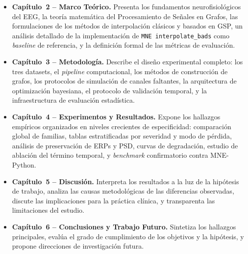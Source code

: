 \begin{itemize}
    \item \textbf{Capítulo~2 -- Marco Teórico.} Presenta los fundamentos neurofisiológicos del EEG, la teoría matemática del Procesamiento de Señales en Grafos, las formulaciones de los métodos de interpolación clásicos y basados en GSP, un análisis detallado de la implementación de \texttt{MNE interpolate\_bads} como \textit{baseline} de referencia, y la definición formal de las métricas de evaluación.

    \item \textbf{Capítulo~3 -- Metodología.} Describe el diseño experimental completo: los tres datasets, el \textit{pipeline} computacional, los métodos de construcción de grafos, los protocolos de simulación de canales faltantes, la arquitectura de optimización bayesiana, el protocolo de validación temporal, y la infraestructura de evaluación estadística.

    \item \textbf{Capítulo~4 -- Experimentos y Resultados.} Expone los hallazgos empíricos organizados en niveles crecientes de especificidad: comparación global de familias, tablas estratificadas por severidad y modo de pérdida, análisis de preservación de ERPs y PSD, curvas de degradación, estudio de ablación del término temporal, y \textit{benchmark} confirmatorio contra MNE-Python.

    \item \textbf{Capítulo~5 -- Discusión.} Interpreta los resultados a la luz de la hipótesis de trabajo, analiza las causas metodológicas de las diferencias observadas, discute las implicaciones para la práctica clínica, y transparenta las limitaciones del estudio.

    \item \textbf{Capítulo~6 -- Conclusiones y Trabajo Futuro.} Sintetiza los hallazgos principales, evalúa el grado de cumplimiento de los objetivos y la hipótesis, y propone direcciones de investigación futura.
\end{itemize}